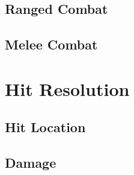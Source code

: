 \subsection{Ranged Combat}

\subsection{Melee Combat}

\section{Hit Resolution}

\subsection{Hit Location}

\subsection{Damage}